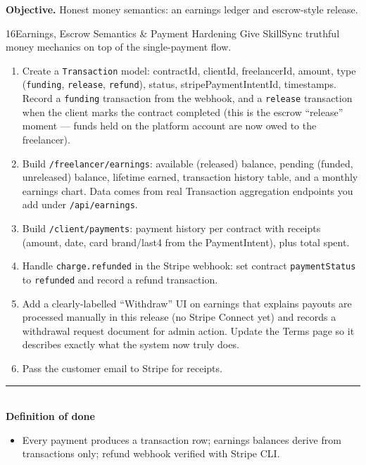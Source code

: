 \documentclass[11pt,a4paper]{article}
\newcommand{\dod}{\medskip\noindent\textcolor{donegreen}{\rule{\linewidth}{0.5pt}}\\[1mm]\textbf{\textcolor{donegreen}{Definition of done}}\\[-2mm]}
\newcommand{\objective}[1]{\noindent\textbf{Objective.} #1\medskip}
\begin{document}
\objective{Honest money semantics: an earnings ledger and escrow-style release.}

\begin{promptbox}{16}{Earnings, Escrow Semantics \& Payment Hardening}
Give SkillSync truthful money mechanics on top of the single-payment flow.

\begin{enumerate}[leftmargin=1.6em]
  \item Create a \texttt{Transaction} model: contractId, clientId, freelancerId,
        amount, type (\texttt{funding}, \texttt{release}, \texttt{refund}), status,
        stripePaymentIntentId, timestamps. Record a \texttt{funding} transaction from
        the webhook, and a \texttt{release} transaction when the client marks the
        contract completed (this is the escrow ``release'' moment --- funds held on
        the platform account are now owed to the freelancer).
  \item Build \texttt{/freelancer/earnings}: available (released) balance, pending
        (funded, unreleased) balance, lifetime earned, transaction history table, and
        a monthly earnings chart. Data comes from real Transaction aggregation
        endpoints you add under \texttt{/api/earnings}.
  \item Build \texttt{/client/payments}: payment history per contract with receipts
        (amount, date, card brand/last4 from the PaymentIntent), plus total spent.
  \item Handle \texttt{charge.refunded} in the Stripe webhook: set contract
        \texttt{paymentStatus} to \texttt{refunded} and record a refund transaction.
  \item Add a clearly-labelled ``Withdraw'' UI on earnings that explains payouts are
        processed manually in this release (no Stripe Connect yet) and records a
        withdrawal request document for admin action. Update the Terms page so it
        describes exactly what the system now truly does.
  \item Pass the customer email to Stripe for receipts.
\end{enumerate}

\dod
\begin{itemize}[leftmargin=1.6em]
  \item Every payment produces a transaction row; earnings balances derive from
        transactions only; refund webhook verified with Stripe CLI.
\end{itemize}
\end{promptbox}
\end{document}
